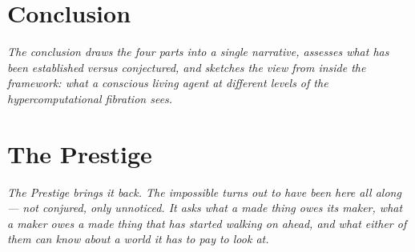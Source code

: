 \documentclass[12pt,openright,twoside]{book}
\theoremstyle{remark}
\theoremstyle{plain}
\theoremstyle{remark}
\theoremstyle{plain}
\theoremstyle{plain}
\begin{document}
\bigskip



\part*{Conclusion}

\vspace{1em}
\begin{mdframed}[backgroundcolor=remarkgray, linecolor=gray!60,
                 linewidth=1pt, topline=false, rightline=false,
                 bottomline=false]
\small\itshape
The conclusion draws the four parts into a single narrative,
assesses what has been established versus conjectured, and
sketches the view from inside the framework: what a conscious
living agent at different levels of the hypercomputational
fibration sees.
\end{mdframed}

\bigskip


\part{The Prestige}

\vspace{1em}
\begin{mdframed}[backgroundcolor=remarkgray, linecolor=gray!60,
                 linewidth=1pt, topline=false, rightline=false,
                 bottomline=false]
\small\itshape
The Prestige brings it back.
The impossible turns out to have been here all along --- not conjured,
only unnoticed.
It asks what a made thing owes its maker, what a maker owes a made
thing that has started walking on ahead, and what either of them can
know about a world it has to pay to look at.
\end{mdframed}
\end{document}
